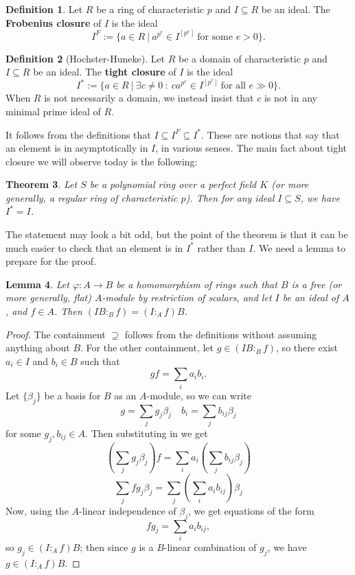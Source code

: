\documentclass[12pt]{amsart}
\newtheorem{theorem}{Theorem}[section]
\newtheorem{lemma}[theorem]{Lemma}
\theoremstyle{definition}
\newtheorem{definition}[theorem]{Definition}
\numberwithin{equation}{theorem}
\def\phi{\varphi}
\def\to{\longrightarrow}
\begin{document}
\begin{definition} Let $R$ be a ring of characteristic $p$ and $I\subseteq R$ be an ideal. The \textbf{Frobenius closure} of $I$ is the ideal
\[ I^F := \{ a\in R \ | \ a^{p^e} \in I^{[p^e]} \ \text{for some $e> 0$}\}.\]
\end{definition}

\begin{definition}[Hochster-Huneke] Let $R$ be a domain of characteristic $p$ and $I\subseteq R$ be an ideal. The \textbf{tight closure} of $I$ is the ideal
\[ I^* := \{ a\in R \ | \ \exists c \neq 0 \ : \ c a^{p^e} \in I^{[p^e]} \ \text{for all $e\gg 0$}\}.\]
When $R$ is not necessarily a domain, we instead insist that $c$ is not in any minimal prime ideal of $R$.
\end{definition}

It follows from the definitions that $I \subseteq I^F \subseteq I^*$. These are notions that say that an element is in asymptotically in $I$, in various senses. The main fact about tight closure we will observe today is the following:

\begin{theorem}\label{thm:tight}
Let $S$ be a polynomial ring over a perfect field $K$ (or more generally, a regular ring of characteristic $p$). Then for any ideal $I\subseteq S$, we have $I^*=I$.
\end{theorem}

The statement may look a bit odd, but the point of the theorem is that it can be much easier to check that an element is in $I^*$ rather than $I$. We need a lemma to prepare for the proof.

\begin{lemma}
Let $\phi:A\to B$ be a homomorphism of rings such that $B$ is a free (or more generally, flat) $A$-module by restriction of scalars, and let $I$ be an ideal of $A$, and $f\in A$. Then ${(IB :_B f) = (I:_A f)B}$.
\end{lemma}
\begin{proof} The containment $\supseteq$ follows from the definitions without assuming anything about $B$. For the other containment, let $g\in (IB :_B f)$, so there exist $a_i\in I$ and $b_i\in B$ such that 
\[ gf= \sum_i a_i b_i.\]
Let $\{\beta_j\}$ be a basis for $B$ as an $A$-module, so we can write 
\[ g = \sum_j g_j \beta_j \quad b_i = \sum_j b_{ij} \beta_j\]
for some $g_j, b_{ij} \in A$. Then substituting in we get
\[ \left( \sum_j g_j \beta_j\right) f = \sum_i a_i \left( \sum_j b_{ij} \beta_j \right)\]
\[ \sum_j f g_j \beta_j = \sum_j \left( \sum_i a_i b_{ij} \right) \beta_j\]
Now, using the $A$-linear independence of $\beta_j$, we get equations of the form
\[ f g_j =  \sum_i a_i b_{ij}, \]
so $g_j\in (I:_A f)B$; then since $g$ is a $B$-linear combination of $g_j$, we have $g\in (I:_A f)B$.
\end{proof}
\end{document}
